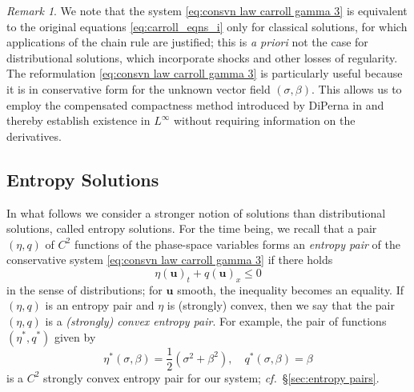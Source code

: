 \documentclass[11pt,a4paper,reqno]{amsart}
\numberwithin{equation}{section}
\theoremstyle{definition}
\theoremstyle{remark}
\newtheorem{remark}[lemma]{Remark}
\newcommand{\bu}{\mathbf{u}}
\renewcommand{\leq}{\leqslant}
\begin{document}
{\begin{remark}
We note that the system \eqref{eq:consvn law carroll gamma 3} is equivalent to the original equations \eqref{eq:carroll_eqns_i} only for classical solutions, for which applications of the chain rule are justified; this is \emph{a priori} not the case for distributional solutions, which incorporate shocks and other losses of regularity. The reformulation \eqref{eq:consvn law carroll gamma 3} is particularly useful because it is in conservative form for the unknown vector field $(\sigma,\beta)$. This allows us to employ the compensated compactness method introduced by DiPerna in \cite{DiPerna83a} and thereby establish existence in $L^\infty$ without requiring information on the derivatives. 
\end{remark}





\subsection{Entropy Solutions} 

In what follows we consider a stronger notion of solutions than distributional solutions, called entropy solutions. For the time being, we recall that a pair $(\eta,q)$ of $C^2$ functions of the phase-space variables forms an \emph{entropy pair} of the conservative system \eqref{eq:consvn law carroll gamma 3} if there holds 
\begin{equation*}
    \eta(\bu)_t + q(\bu)_x \leq 0 
\end{equation*}
in the sense of distributions; for $\bu$ smooth, the inequality becomes an equality. If $(\eta,q)$ is an entropy pair and $\eta$ is (strongly) convex, then we say that the pair $(\eta,q)$ is a \emph{(strongly) convex entropy pair}. For example, the pair of functions $(\eta^*,q^*)$ given by 
\begin{equation}\label{eq:special entropy}
    \eta^*(\sigma,\beta) = \frac{1}{2}(\sigma^2 + \beta^2), \quad q^*(\sigma,\beta) = \beta 
\end{equation}
is a $C^2$ strongly convex entropy pair for our system; \textit{cf.}~\S \ref{sec:entropy pairs}. 



}
\end{document}
